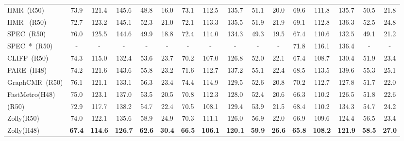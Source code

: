 \documentclass[10pt,twocolumn,letterpaper]{article}
\def\Ours{{Zolly}\xspace}
\begin{document}
{\begin{table*}[h]
{\begin{tabular}{lccccc|ccccc|ccccc}
\rule{0pt}{10pt} HMR~(R50)~\cite{hmr}  & 73.9 & 121.4 & 145.6 & 48.8 & 16.0 & 73.1 & 112.5 & 135.7 & 51.1 & 20.0 & 69.6 & 111.8 & 135.7 & 50.5 & 21.8\\

\rule{0pt}{10pt} HMR-~(R50)~\cite{hmr}& 72.7 & 123.2 & 145.1 & 52.3 & 21.0 & 72.1 & 113.3 & 135.5 & 51.9 & 21.9 & 69.1 & 112.8 & 136.3 & 52.5 & 24.8 \\

\rule{0pt}{10pt} SPEC~(R50)~\cite{spec}  &   76.0 & 125.5 & 144.6 & 49.9 & 18.8 & 72.4 & 114.0 & 134.3 & 49.3 & 19.5 & 67.4 & 110.6& 132.5 & 49.1 & 21.2  \\

\rule{0pt}{10pt} SPEC~*~(R50)~\cite{spec}  &  -& -& -& -& -& -& -& -& -& -& 71.8& 116.1&  136.4 & -& - \\


\rule{0pt}{10pt} CLIFF~(R50)~\cite{cliff} & 74.3 & 115.0 & 132.4 & 53.6 & 23.7 & 70.2 & 107.0 & 126.8 & 52.0 & 22.1 & 67.4 & 108.7 & 130.4 & 51.9 & 23.4\\



\rule{0pt}{10pt} PARE~(H48)~\cite{pare} & 74.2 & 121.6 & 143.6 & 55.8 & 23.2 & 71.6 & 112.7 & 137.2 & 55.1 & 22.4 & 68.5 & 113.5 & 139.6 & 55.3 & 25.1  \\

\midrule
\rule{0pt}{10pt} GraphCMR~(R50)   & 76.1 & 121.1 & 133.1 & 56.3 & 23.4 & 74.4 & 114.9 & 129.5 & 52.6 & 20.8 &  70.2 & 112.7 & 127.8 & 51.7 & 22.0\\

\rule{0pt}{10pt} FastMetro(H48)~\cite{fastmetro}   & 75.0   & 123.1  & 137.0 & 53.5  & 20.5 & 70.8 & 112.3 & 128.0 & 52.4 & 20.6 & 66.3 & 110.2 & 126.5 & 51.8 & 22.6   \\

\midrule
\rule{0pt}{10pt}  (R50)  & 72.9 & 117.7 & 138.2 & 54.7 & 22.4 & 70.5 & 108.1 & 129.4 & 53.9 & 21.5 &  68.4 & 110.2 & 134.3 & 54.7 & 24.2 \\
\rule{0pt}{10pt} \Ours (R50)  & 74.0 & 122.1 & 135.6 & 58.9 & 24.9 & 70.3 & 111.1 & 126.0 & 56.9 & 22.0 & 66.9 & 109.6 & 124.4 & 56.5 & 23.4 \\
\rule{0pt}{10pt} \Ours (H48)  & \textbf{67.4} & \textbf{114.6} & \textbf{126.7} & \textbf{62.6} & \textbf{30.4}   & \textbf{66.5} & \textbf{106.1} & \textbf{120.1} & \textbf{59.9} & \textbf{26.6} & \textbf{65.8} & \textbf{108.2} & \textbf{121.9} & \textbf{58.5} & \textbf{27.0} \\
\bottomrule
\end{tabular}
 }
    

\end{table*}}
\end{document}
